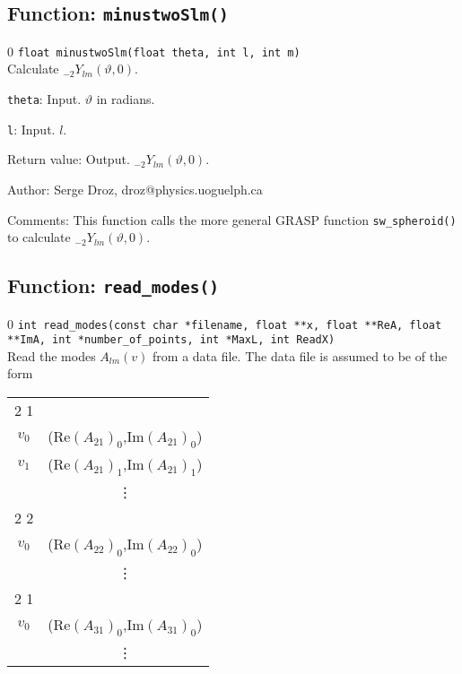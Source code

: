 %
%

\subsection{Function: {\tt minustwoSlm()}}
\setcounter{equation}0
{\tt float minustwoSlm(float theta, int l, int m)}\\
Calculate ${}_{-2}Y_{lm}(\vartheta,0)$.
\begin{description}
\item{{\tt theta}}: Input. $\vartheta$ in radians.
\item{{\tt l}}: Input. $l$.
\item{Return value}: Output. ${}_{-2}Y_{lm}(\vartheta,0)$.
\end{description}
\begin{description}
\item{Author:} Serge Droz, droz@physics.uoguelph.ca
\item{Comments:} This function calls the more general GRASP function 
                 {\tt sw\_spheroid()} to calculate  ${}_{-2}Y_{lm}(\vartheta,0)$.
\end{description}
\clearpage
%
%

\subsection{Function: {\tt read\_modes()}}
\setcounter{equation}0
{\tt int read\_modes(const  char *filename, float **x, float **ReA, float **ImA, 
               int *number\_of\_points, int *MaxL, int ReadX)  }\\
Read the modes $A_{lm}(v)$ from a data file. The data file
is assumed to be of the form \\
\begin{tabular}{cc}
 2 1 & \\
 $v_0$ &(Re$(A_{21})_0$,Im$(A_{21})_0$) \\
 $v_1$ & (Re$(A_{21})_1$,Im$(A_{21})_1$)  \\
 & \vdots \\
 2 2 & \\
 $v_0$ &(Re$(A_{22})_0$,Im$(A_{22})_0$) \\
 & \vdots \\
 2 1 & \\
 $v_0$ &(Re$(A_{31})_0$,Im$(A_{31})_0$) \\
 & \vdots \\
\end{tabular}\\


